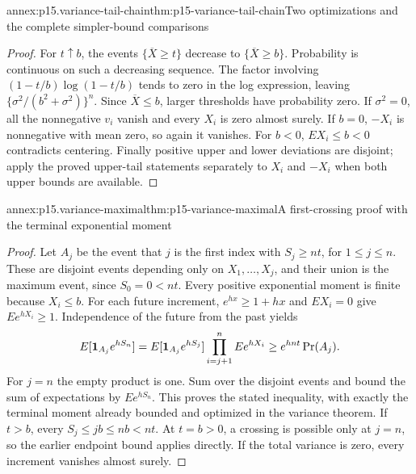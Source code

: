 \begin{annexitem}{annex:p15.variance-tail-chain}{thm:p15-variance-tail-chain}{Two optimizations and the complete simpler-bound comparisons}
\begin{proof}
For \(t\uparrow b\), the events \(\{\overline X\geq t\}\) decrease
to \(\{\overline X\geq b\}\). Probability is continuous on such a
decreasing sequence. The factor involving
\((1-t/b)\log(1-t/b)\) tends to zero in the log expression, leaving
\(\{\sigma^2/(b^2+\sigma^2)\}^n\). Since \(\overline X\leq b\),
larger thresholds have probability zero.
If \(\sigma^2=0\), all the nonnegative \(v_i\) vanish and every \(X_i\)
is zero almost surely. If \(b=0\), \(-X_i\) is nonnegative with mean zero,
so again it vanishes. For \(b<0\), \(EX_i\leq b<0\) contradicts
centering. Finally positive upper and lower deviations are disjoint;
apply the proved upper-tail statements separately to \(X_i\) and
\(-X_i\) when both upper bounds are available.
\end{proof}
\end{annexitem}

\begin{annexitem}{annex:p15.variance-maximal}{thm:p15-variance-maximal}{A first-crossing proof with the terminal exponential moment}
\begin{proof}
Let \(A_j\) be the event that \(j\) is the first index with
\(S_j\geq nt\), for \(1\leq j\leq n\). These are disjoint events
depending only on \(X_1,\ldots,X_j\), and their union is the maximum
event, since \(S_0=0<nt\).
Every positive exponential moment is finite because \(X_i\leq b\).
For each future increment, \(e^{hx}\geq1+hx\) and \(EX_i=0\)
give \(Ee^{hX_i}\geq1\). Independence of the future from the past yields
\[
 E[{\bf1}_{A_j}e^{hS_n}]
 =E[{\bf1}_{A_j}e^{hS_j}]\prod_{i=j+1}^nEe^{hX_i}
 \geq e^{hnt}\Pr(A_j).
\]
For \(j=n\) the empty product is one.
Sum over the disjoint events and bound the sum of expectations by
\(Ee^{hS_n}\). This proves the stated inequality, with exactly the
terminal moment already bounded and optimized in the variance theorem.
If \(t>b\), every \(S_j\leq jb\leq nb<nt\).
At \(t=b>0\), a crossing is possible only at \(j=n\), so the earlier
endpoint bound applies directly. If the total variance is zero, every
increment vanishes almost surely.
\end{proof}
\end{annexitem}

